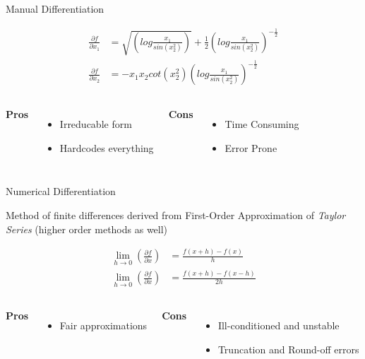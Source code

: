 \documentclass{beamer}
\begin{document}
\begin{frame}{Manual Differentiation}

\begin{align}
\frac{\partial f}{\partial x_1} &= \sqrt{\left(log\frac{x_1}{sin(x_2^2)}\right)} + \frac{1}{2} \left(log\frac{x_1}{sin(x_2^2)}\right)^{-\frac{1}{2}} \\
\frac{\partial f}{\partial x_2} &= -x_1x_2cot(x_2^2)\left(log\frac{x_1}{sin(x_2^2)}\right)^{-\frac{1}{2}}
\end{align}

\begin{columns}[T,onlytextwidth]
      \textbf{Pros}
      \begin{itemize}
        \item Irreducable form
        \item Hardcodes everything
      \end{itemize}

      \textbf{Cons}
      \begin{itemize}
        \item Time Consuming
        \item Error Prone
      \end{itemize}
\end{columns}

\end{frame}

\begin{frame}{Numerical Differentiation}

Method of finite differences derived from First-Order Approximation of \textit{Taylor Series}
(higher order methods as well) \cite{Burden:1988:NAE:49376}

\begin{align}
\lim_{h \to 0} \left(\frac{\partial f}{\partial x}\right) &= \frac{f(x+h)-f(x)}{h} \\
\lim_{h \to 0} \left(\frac{\partial f}{\partial x}\right) &= \frac{f(x+h)-f(x-h)}{2h}
\end{align}

\begin{columns}[T,onlytextwidth]
      \textbf{Pros}
      \begin{itemize}
        \item Fair approximations
      \end{itemize}

      \textbf{Cons}
      \begin{itemize}
        \item Ill-conditioned and unstable
        \item Truncation and Round-off errors
      \end{itemize}
\end{columns}

\end{frame}
\end{document}
